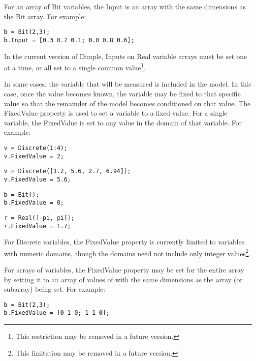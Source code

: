 For an array of Bit variables, the Input is an array with the same dimensions as the Bit array.  For example:

\begin{lstlisting}
b = Bit(2,3);
b.Input = [0.3 0.7 0.1; 0.0 0.8 0.6];
\end{lstlisting}

In the current version of Dimple, Inputs on Real variable arrays must be set one at a time, or all set to a single common value\footnote{This restriction may be removed in a future version.}.

\fi

\label{sec:FixingAVariableValue}

In some cases, the variable that will be measured is included in the model.  In this case, once the value becomes known, the variable may be fixed to that specific value so that the remainder of the model becomes conditioned on that value.  The FixedValue property is used to set a variable to a fixed value.  For a single variable, the FixedValue is set to any value in the domain of that variable.  For example:

\begin{lstlisting}
v = Discrete(1:4);
v.FixedValue = 2;
\end{lstlisting}

\begin{lstlisting}
v = Discrete([1.2, 5.6, 2.7, 6.94]);
v.FixedValue = 5.6;
\end{lstlisting}

\begin{lstlisting}
b = Bit();
b.FixedValue = 0;
\end{lstlisting}

\begin{lstlisting}
r = Real([-pi, pi]);
r.FixedValue = 1.7;
\end{lstlisting}

For Discrete variables, the FixedValue property is currently limited to variables with numeric domains, though the domains need not include only integer values\footnote{This limitation may be removed in a future version.}.


\ifmatlab

For arrays of variables, the FixedValue property may be set for the entire array by setting it to an array of values of with the same dimensions as the array (or subarray) being set.  For example:

\begin{lstlisting}
b = Bit(2,3);
b.FixedValue = [0 1 0; 1 1 0];
\end{lstlisting}

